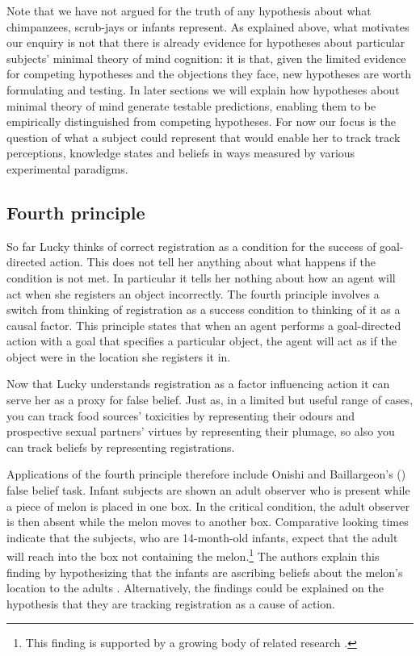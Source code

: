 \documentclass[12pt,\papersize]{extarticle}
\begin{document}
Note that we have not argued for the truth of any hypothesis about what chimpanzees, scrub-jays or infants represent.
As explained above, what motivates our enquiry is not that there is already evidence for hypotheses about particular subjects' minimal theory of mind cognition: it is that, given the limited evidence for competing hypotheses and the objections they face, new hypotheses are worth formulating and testing.
In later sections we will explain how hypotheses about minimal theory of mind generate testable predictions, enabling them to be empirically distinguished from competing hypotheses.
For now our focus is the question of what a subject could represent that would enable her to track track perceptions, knowledge states and beliefs in ways measured by various experimental paradigms.




\subsection{Fourth principle}

So far Lucky thinks of correct registration as a condition for the success of goal-directed action.  This does not tell her anything about what happens if the condition is not met.  In particular it tells her nothing about how an agent will act when she registers an object incorrectly.  The fourth principle involves a switch from thinking of registration as a success condition to thinking of it as a causal factor.  This principle states that when an agent performs a goal-directed action with a goal that specifies a particular object, the agent will act as if the object were in the location she registers it in.

Now that Lucky understands registration as a factor influencing action it can serve her as a proxy for false belief.  Just as, in a limited but useful range of cases, you can track food sources' toxicities by representing their odours
and prospective sexual partners’ virtues by representing their plumage, so also you can track beliefs by representing registrations.

Applications of the fourth principle therefore include Onishi and Baillargeon’s (\citeyear[]{en_1092}) false belief task.  Infant subjects are shown an adult observer who is present while a piece of melon is placed in one box.  In the critical condition, the adult observer is then absent while the melon moves to another box.  Comparative looking times indicate that the subjects, who are 14-month-old infants, expect that the adult will reach into the box not containing the melon.\footnote{ 	This finding is supported by a growing body of related research \citep[including][]{en_1666, en_1690, en_1691, en_1208, en_1261}.}  The authors explain this finding by hypothesizing that the infants are ascribing beliefs about the melon’s location to the adults \citep[][p.\ 257]{en_1092}.  Alternatively, the findings could be explained on the hypothesis that they are tracking registration as a cause of action.
\end{document}
